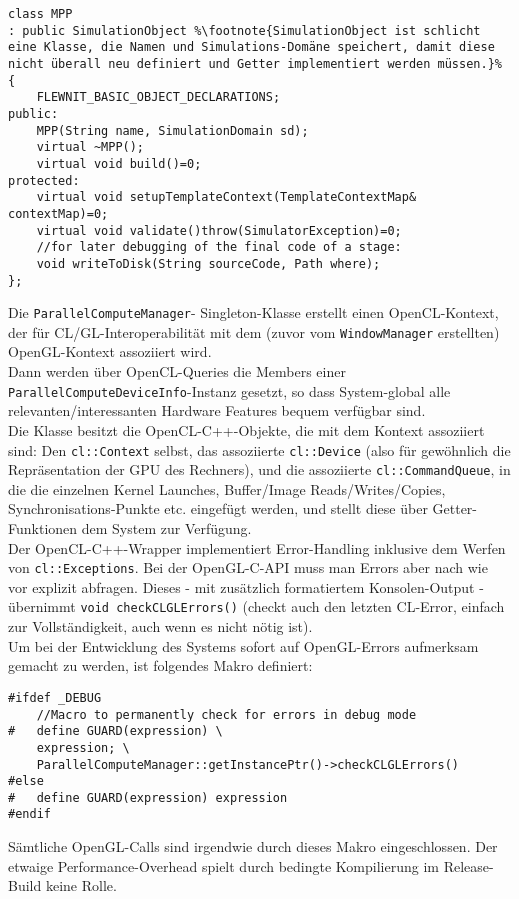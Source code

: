 	\begin{lstlisting}[escapechar=\%]
class MPP
: public SimulationObject %\footnote{SimulationObject ist schlicht eine Klasse, die Namen und Simulations-Domäne speichert, damit diese nicht überall neu definiert und Getter implementiert werden müssen.}%
{
	FLEWNIT_BASIC_OBJECT_DECLARATIONS;
public:
	MPP(String name, SimulationDomain sd);
	virtual ~MPP();
	virtual void build()=0;
protected:
	virtual void setupTemplateContext(TemplateContextMap& contextMap)=0;
	virtual void validate()throw(SimulatorException)=0;
	//for later debugging of the final code of a stage:
	void writeToDisk(String sourceCode, Path where);
};
\end{lstlisting}



	Die \lstinline|ParallelComputeManager|- Singleton-Klasse erstellt einen OpenCL-Kontext, der für CL/GL-Interoperabilität 
	mit dem (zuvor vom \lstinline|WindowManager| erstellten) OpenGL-Kontext assoziiert wird.\\
	Dann werden über OpenCL-Queries die Members einer \lstinline|ParallelComputeDeviceInfo|-Instanz
	gesetzt, so dass System-global alle relevanten/interessanten Hardware Features bequem verfügbar sind.\\
	
	Die Klasse besitzt die OpenCL-C++-Objekte, die mit dem Kontext assoziiert sind:
	Den \lstinline|cl::Context| selbst, das assoziierte \lstinline|cl::Device| (also für gewöhnlich die
	Repräsentation der GPU des Rechners), und die assoziierte \lstinline|cl::CommandQueue|, in die die einzelnen
	Kernel Launches, Buffer/Image Reads/Writes/Copies, Synchronisations-Punkte etc. eingefügt werden,
	und stellt diese über Getter-Funktionen dem System zur Verfügung.\\
	
	Der OpenCL-C++-Wrapper implementiert Error-Handling inklusive dem Werfen von \lstinline|cl::Exceptions|.
	Bei der OpenGL-C-API muss man Errors aber nach wie vor explizit abfragen. Dieses - mit zusätzlich formatiertem
	Konsolen-Output - übernimmt \lstinline|void checkCLGLErrors()| (checkt auch den letzten CL-Error, einfach zur 
	Vollständigkeit, auch wenn es nicht nötig ist).\\
	Um bei der Entwicklung des Systems	sofort auf OpenGL-Errors aufmerksam gemacht zu werden, ist folgendes Makro
	definiert:
\begin{lstlisting}	
#ifdef _DEBUG
	//Macro to permanently check for errors in debug mode
#	define GUARD(expression) \
	expression; \
	ParallelComputeManager::getInstancePtr()->checkCLGLErrors()
#else
#	define GUARD(expression) expression
#endif
\end{lstlisting}
	Sämtliche OpenGL-Calls sind irgendwie durch dieses Makro eingeschlossen. Der etwaige Performance-Overhead spielt
	durch bedingte Kompilierung im Release-Build keine Rolle.\\
	
